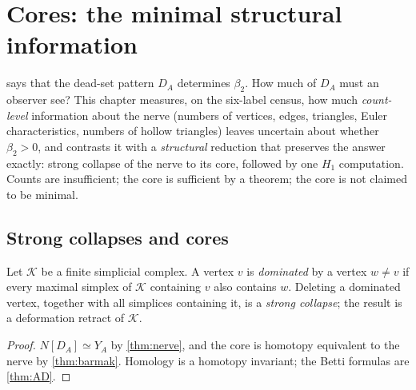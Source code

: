 \chapter{Cores: the minimal structural information}\label{ch:minimal}

 says that the dead-set pattern $D_A$ determines $\beta_2$. How much of $D_A$ must an observer see? This chapter measures, on the six-label census, how much \emph{count-level} information about the nerve (numbers of vertices, edges, triangles, Euler characteristics, numbers of hollow triangles) leaves uncertain about whether $\beta_2>0$, and contrasts it with a \emph{structural} reduction that preserves the answer exactly: strong collapse of the nerve to its core, followed by one $H_1$ computation. Counts are insufficient; the core is sufficient by a theorem; the core is not claimed to be minimal.

\section{Strong collapses and cores}
Let $\mathcal K$ be a finite simplicial complex. A vertex $v$ is \emph{dominated} by a vertex $w\neq v$ if every maximal simplex of $\mathcal K$ containing $v$ also contains $w$. Deleting a dominated vertex, together with all simplices containing it, is a \emph{strong collapse}; the result is a deformation retract of $\mathcal K$.
\begin{proof}
$N[D_A]\simeq Y_A$ by \cref{thm:nerve}, and the core is homotopy equivalent to the nerve by \cref{thm:barmak}. Homology is a homotopy invariant; the Betti formulas are \cref{thm:AD}.
\end{proof}

